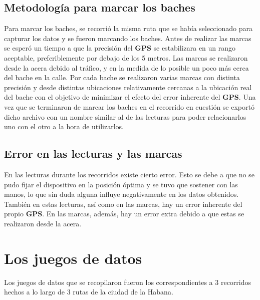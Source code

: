 	\subsection{Metodología para marcar los baches}
		Para marcar los baches, se recorrió la misma ruta que se había seleccionado para capturar los datos y se fueron marcando los baches. Antes 
		de realizar las marcas se esperó un tiempo a que la precisión del \textbf{GPS} se estabilizara en un rango aceptable, preferiblemente por debajo 
		de los 5 metros. Las marcas se realizaron desde la acera debido al tráfico, y en la medida de lo posible un poco más cerca del bache en la calle.
		Por cada bache se realizaron varias marcas con distinta precisión y desde distintas ubicaciones relativamente cercanas a la ubicación real del
		bache con el objetivo de minimizar el efecto del error inherente del \textbf{GPS}. Una vez que se terminaron de marcar los baches en el recorrido
		en cuestión se exportó dicho archivo con un nombre similar al de las lecturas para poder relacionarlos uno con el otro a la hora de utilizarlos.

	\subsection{Error en las lecturas y las marcas}
		En las lecturas durante los recorridos existe cierto error. Esto se debe a que no se pudo fijar el dispositivo en la posición óptima y se tuvo que
		sostener con las manos, lo que sin duda alguna influye negativamente en los datos obtenidos. También en estas lecturas, así como en las marcas, hay un
		error inherente del propio \textbf{GPS}. En las marcas, además, hay un error extra debido a que estas se realizaron desde la acera.

\section{Los juegos de datos}   
	Los juegos de datos que se recopilaron fueron los correspondientes a 3 recorridos hechos a lo largo de 3 rutas de la ciudad de la Habana.

